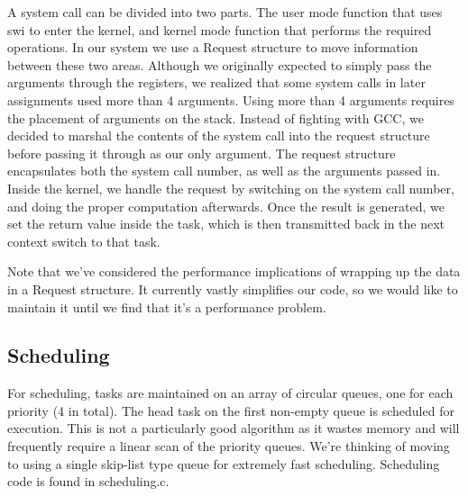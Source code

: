 \documentclass{article}
\begin{document}
A system call can be divided into two parts. The user mode function that uses swi to enter the kernel, and kernel mode function that performs the required operations. In our system we use a Request structure to move information between these two areas. Although we originally expected to simply pass the arguments through the registers, we realized that some system calls in later assignments used more than 4 arguments. Using more than 4 arguments requires the placement of arguments on the stack. Instead of fighting with GCC, we decided to marshal the contents of the system call into the request structure before passing it through as our only argument. The request structure encapsulates both the system call number, as well as the arguments passed in. Inside the kernel, we handle the request by switching on the system call number, and doing the proper computation afterwards. Once the result is generated, we set the return value inside the task, which is then transmitted back in the next context switch to that task.

Note that we've considered the performance implications of wrapping up the data in a Request structure. It currently vastly simplifies our code, so we would like to maintain it until we find that it's a performance problem.

\subsection{Scheduling}

For scheduling, tasks are maintained on an array of circular queues, one for each priority (4 in total). The head task on the first non-empty queue is scheduled for execution. This is not a particularly good algorithm as it wastes memory and will frequently require a linear scan of the priority queues. We're thinking of moving to using a single skip-list type queue for extremely fast scheduling. Scheduling code is found in scheduling.c.
\end{document}
